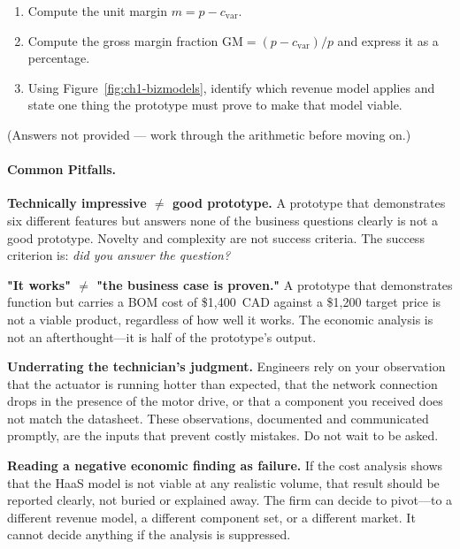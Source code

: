 \begin{enumerate}
  \item Compute the unit margin $m = p - c_{\text{var}}$.
  \item Compute the gross margin fraction $\text{GM} = (p - c_{\text{var}})/p$
        and express it as a percentage.
  \item Using Figure~\ref{fig:ch1-bizmodels}, identify which revenue model applies
        and state one thing the prototype must prove to make that model viable.
\end{enumerate}

\noindent(Answers not provided — work through the arithmetic before moving on.)

\paragraph{Common Pitfalls.}

\textbf{Technically impressive $\neq$ good prototype.}
A prototype that demonstrates six different features but answers none of
the business questions clearly is not a good prototype.
Novelty and complexity are not success criteria.
The success criterion is: \emph{did you answer the question?}

\textbf{"It works" $\neq$ "the business case is proven."}
A prototype that demonstrates function but carries a BOM cost of
\$1,400~CAD against a \$1,200 target price is not a viable product,
regardless of how well it works.
The economic analysis is not an afterthought---it is half of the
prototype's output.

\textbf{Underrating the technician's judgment.}
Engineers rely on your observation that the actuator is running hotter
than expected, that the network connection drops in the presence of the
motor drive, or that a component you received does not match the
datasheet.
These observations, documented and communicated promptly, are the inputs
that prevent costly mistakes.
Do not wait to be asked.

\textbf{Reading a negative economic finding as failure.}
If the cost analysis shows that the HaaS model is not viable at any
realistic volume, that result should be reported clearly, not buried or
explained away.
The firm can decide to pivot---to a different revenue model, a
different component set, or a different market.
It cannot decide anything if the analysis is suppressed.


